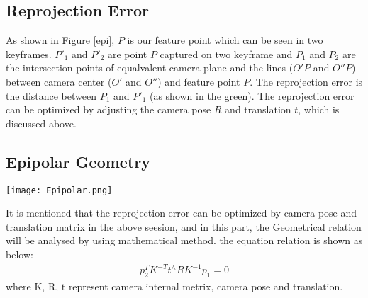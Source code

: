 \subsection{Reprojection Error}
As shown in Figure \ref{epi}, $P$ is our feature point which can be seen in two keyframes. $P'_1$ and $P'_2$ are point $P$ captured on two keyframe and $P_1$ and $P_2$ are the intersection points of equalvalent camera plane and the lines ($O'P$ and $O''P$) between camera center ($O'$ and $O''$) and feature point $P$. The reprojection error is the distance between $P_1$ and $P'_1$ (as shown in the green). The reprojection error can be optimized by adjusting the camera pose $R$ and translation $t$, which is discussed above.

\subsection{Epipolar Geometry}
\begin{figure*}
    \centering
    \texttt{[image: Epipolar.png]}
    \caption{Epipolar Geometry and Reprojection Error}
    \label{epi}
\end{figure*}
It is mentioned that the reprojection error can be optimized by camera pose and translation matrix in the above seesion, and in this part, the Geometrical relation will be analysed by using mathematical method. the equation relation is shown as below:
\begin{align}
    p^T_2K^{-T}t^{\wedge}RK^{-1}p_1 = 0 
\end{align}
where K, R, t represent camera internal metrix, camera pose and translation.
